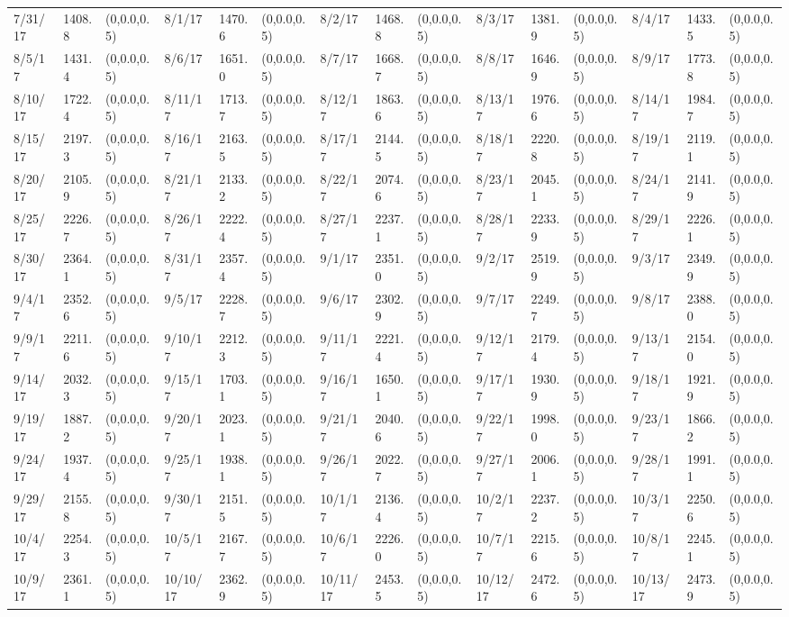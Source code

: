 \documentclass[12pt]{article}
\begin{document}
\begin{table}
\begin{center}
\begin{tabular}{p{15pt}p{15pt}p{25pt}p{15pt}p{15pt}p{25pt}p{15pt}p{15pt}p{25pt}p{15pt}p{15pt}p{25pt}p{15pt}p{15pt}p{25pt}}
    7/31/17&1408.8&(0,0.0,0.5)&8/1/17&1470.6&(0,0.0,0.5)&8/2/17&1468.8&(0,0.0,0.5)&8/3/17&1381.9&(0,0.0,0.5)&8/4/17&1433.5&(0,0.0,0.5)\\
    8/5/17&1431.4&(0,0.0,0.5)&8/6/17&1651.0&(0,0.0,0.5)&8/7/17&1668.7&(0,0.0,0.5)&8/8/17&1646.9&(0,0.0,0.5)&8/9/17&1773.8&(0,0.0,0.5)\\
    8/10/17&1722.4&(0,0.0,0.5)&8/11/17&1713.7&(0,0.0,0.5)&8/12/17&1863.6&(0,0.0,0.5)&8/13/17&1976.6&(0,0.0,0.5)&8/14/17&1984.7&(0,0.0,0.5)\\
    8/15/17&2197.3&(0,0.0,0.5)&8/16/17&2163.5&(0,0.0,0.5)&8/17/17&2144.5&(0,0.0,0.5)&8/18/17&2220.8&(0,0.0,0.5)&8/19/17&2119.1&(0,0.0,0.5)\\
    8/20/17&2105.9&(0,0.0,0.5)&8/21/17&2133.2&(0,0.0,0.5)&8/22/17&2074.6&(0,0.0,0.5)&8/23/17&2045.1&(0,0.0,0.5)&8/24/17&2141.9&(0,0.0,0.5)\\
    8/25/17&2226.7&(0,0.0,0.5)&8/26/17&2222.4&(0,0.0,0.5)&8/27/17&2237.1&(0,0.0,0.5)&8/28/17&2233.9&(0,0.0,0.5)&8/29/17&2226.1&(0,0.0,0.5)\\
    8/30/17&2364.1&(0,0.0,0.5)&8/31/17&2357.4&(0,0.0,0.5)&9/1/17&2351.0&(0,0.0,0.5)&9/2/17&2519.9&(0,0.0,0.5)&9/3/17&2349.9&(0,0.0,0.5)\\
    9/4/17&2352.6&(0,0.0,0.5)&9/5/17&2228.7&(0,0.0,0.5)&9/6/17&2302.9&(0,0.0,0.5)&9/7/17&2249.7&(0,0.0,0.5)&9/8/17&2388.0&(0,0.0,0.5)\\
    9/9/17&2211.6&(0,0.0,0.5)&9/10/17&2212.3&(0,0.0,0.5)&9/11/17&2221.4&(0,0.0,0.5)&9/12/17&2179.4&(0,0.0,0.5)&9/13/17&2154.0&(0,0.0,0.5)\\
    9/14/17&2032.3&(0,0.0,0.5)&9/15/17&1703.1&(0,0.0,0.5)&9/16/17&1650.1&(0,0.0,0.5)&9/17/17&1930.9&(0,0.0,0.5)&9/18/17&1921.9&(0,0.0,0.5)\\
    9/19/17&1887.2&(0,0.0,0.5)&9/20/17&2023.1&(0,0.0,0.5)&9/21/17&2040.6&(0,0.0,0.5)&9/22/17&1998.0&(0,0.0,0.5)&9/23/17&1866.2&(0,0.0,0.5)\\
    9/24/17&1937.4&(0,0.0,0.5)&9/25/17&1938.1&(0,0.0,0.5)&9/26/17&2022.7&(0,0.0,0.5)&9/27/17&2006.1&(0,0.0,0.5)&9/28/17&1991.1&(0,0.0,0.5)\\
    9/29/17&2155.8&(0,0.0,0.5)&9/30/17&2151.5&(0,0.0,0.5)&10/1/17&2136.4&(0,0.0,0.5)&10/2/17&2237.2&(0,0.0,0.5)&10/3/17&2250.6&(0,0.0,0.5)\\
    10/4/17&2254.3&(0,0.0,0.5)&10/5/17&2167.7&(0,0.0,0.5)&10/6/17&2226.0&(0,0.0,0.5)&10/7/17&2215.6&(0,0.0,0.5)&10/8/17&2245.1&(0,0.0,0.5)\\
    10/9/17&2361.1&(0,0.0,0.5)&10/10/17&2362.9&(0,0.0,0.5)&10/11/17&2453.5&(0,0.0,0.5)&10/12/17&2472.6&(0,0.0,0.5)&10/13/17&2473.9&(0,0.0,0.5)\\

\end{tabular}
\end{center}
\end{table}
\end{document}
